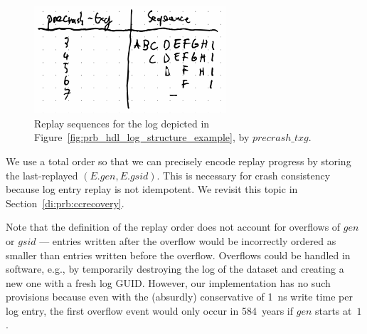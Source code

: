 \documentclass[12pt,a4paper,twoside]{book}
\begin{document}
\begin{figure}[H]
    \centering
    \includegraphics[height=4cm]{fig/prb_hdl_log_structure_example__replay}
    \caption{Replay sequences for the log depicted in Figure~\ref{fig:prb_hdl_log_structure_example}, by $precrash\_txg$. }
    \label{fig:prb_hdl_log_structure_example__replay}
\end{figure}

We use a total order so that we can precisely encode replay progress by storing the last-replayed $(E.gen, E.gsid)$.
This is necessary for crash consistency because log entry replay is not idempotent.
We revisit this topic in Section~\ref{di:prb:ccrecovery}.

Note that the definition of the replay order does not account for overflows of $gen$ or $gsid$ --- entries written after the overflow would be incorrectly ordered as smaller than entries written before the overflow.
Overflows could be handled in software, e.g., by temporarily destroying the log of the dataset and creating a new one with a fresh log GUID.
However, our implementation has no such provisions because even with the (absurdly) conservative of \SI{1}{ns} write time per log entry, the first overflow event would only occur in \SI{584}{years} if $gen$ starts at~$1$.
\end{document}
